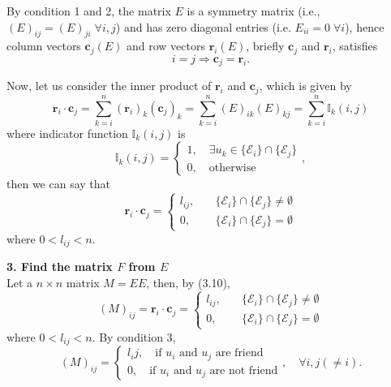 \documentclass[twoside]{article}
\theoremstyle{definition}
\theoremstyle{remark}
\begin{document}
By condition 1 and 2, the matrix $E$ is a symmetry matrix (i.e., $(E)_{ij} = (E)_{ji} \;\forall i, j$)
and has zero diagonal entries (i.e. $E_{ii} = 0 \;\forall i$),
hence column vectors $\mathbf{c}_j(E)$ and row vectors $\mathbf{r}_i(E)$,
briefly $\mathbf{c}_j$ and $\mathbf{r}_i$, satisfies
\begin{equation}
  i = j \Rightarrow \mathbf{c}_j = \mathbf{r}_i.
\end{equation}

Now, let us consider the inner product of $\mathbf{r}_i$ and $\mathbf{c}_j$, which
is given by
\begin{equation}
  \mathbf{r}_i \cdot \mathbf{c}_j
  = \sum_{k = i}^{n} (\mathbf{r}_i)_k (\mathbf{c}_j)_k
  = \sum_{k = i}^{n} (E)_{ik} (E)_{kj}
  = \sum_{k = i}^{n} \mathbb{I}_k(i, j)
\end{equation}
where indicator function $\mathbb{I}_k(i, j)$ is
\begin{equation}
  \mathbb{I}_k(i, j) = \left\{
  \begin{array}{ll}
    1, \quad \exists u_k \in \{\mathcal{E}_i\} \cap \{\mathcal{E}_j\}\\
    0, \quad \textrm{otherwise}
  \end{array}
  \right.,
\end{equation}
then we can say that
\begin{equation}
  \mathbf{r}_i \cdot \mathbf{c}_j = \left\{
  \begin{array}{ll}
    l_{ij}, \quad & \{\mathcal{E}_i\} \cap \{\mathcal{E}_j\} \neq \emptyset \\
    0, \quad & \{\mathcal{E}_i\} \cap \{\mathcal{E}_j\} = \emptyset
  \end{array}
  \right.
\end{equation}
where $0 < l_{ij} < n$.

\textbf{3. Find the matrix $F$ from $E$} \\[0.5\baselineskip]
Let a $n \times n$ matrix $M = EE$, then, by (3.10),
\begin{equation}
  {(M)}_{ij} = \mathbf{r}_i \cdot \mathbf{c}_j = \left\{
  \begin{array}{ll}
    l_{ij}, \quad & \{\mathcal{E}_i\} \cap \{\mathcal{E}_j\} \neq \emptyset \\
    0, \quad & \{\mathcal{E}_i\} \cap \{\mathcal{E}_j\} = \emptyset
  \end{array}
  \right.
\end{equation}
where $0 < l_{ij} < n$. By condition 3,
\begin{equation}
  {(M)}_{ij} = \left\{
  \begin{array}{ll}
    l_ij, \quad \textrm{if $u_i$ and $u_j$ are friend}\\
    0,    \quad \textrm{if $u_i$ and $u_j$ are not friend}
  \end{array}
  \right., \quad \forall i, j(\neq i).
\end{equation}
\end{document}
